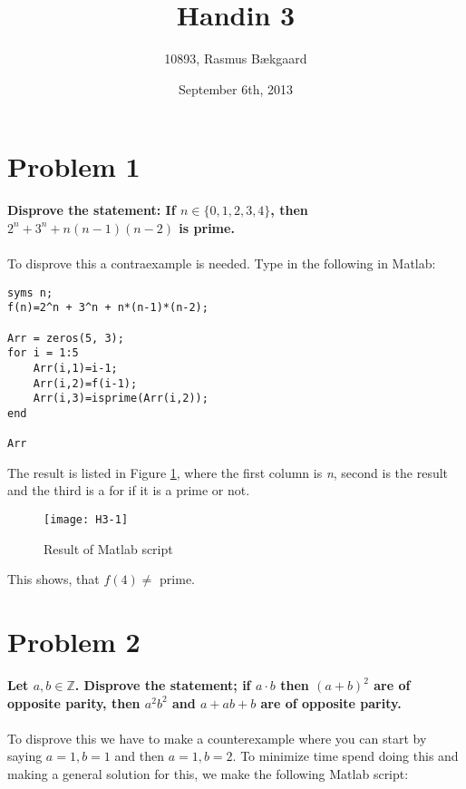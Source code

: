 \documentclass[english,10pt,a4paper]{article}
\title{Handin 3}
\author{10893, Rasmus Bækgaard}
\date{September 6th, 2013}
\begin{document}
\maketitle

\section*{Problem 1}
\textbf{Disprove the statement: If $n \in \{0, 1, 2, 3, 4\}$, then $2^n + 3^n + n(n-1)(n-2)$ is prime.}
\\
\\
To disprove this a contraexample is needed. 
Type in the following in Matlab:

\begin{lstlisting}[caption=Problem 1, style=Code-Matlab, label=lst:ref]
syms n;
f(n)=2^n + 3^n + n*(n-1)*(n-2);

Arr = zeros(5, 3);
for i = 1:5
    Arr(i,1)=i-1;
    Arr(i,2)=f(i-1);
    Arr(i,3)=isprime(Arr(i,2));
end

Arr
\end{lstlisting}
The result is listed in Figure \ref{fig:prob1}, where the first column is \textit{n}, second is the result and the third is a  for if it is a prime or not.
\begin{figure}[hbtp]
\centering
\texttt{[image: H3-1]}
\caption{Result of Matlab script}
\label{fig:prob1}
\end{figure}
This shows, that $f(4) \not=$ prime.


\section*{Problem 2}
\textbf{Let $a,b \in \mathbb{Z}$. Disprove the statement; if $a\cdot b$ then $(a+b)^2$ are of opposite parity, then $a^2b^2$ and $a+ab+b$ are of opposite parity.}
\\
\\
To disprove this we have to make a counterexample where you can start by saying $a=1, b=1$ and then $a=1, b=2$.
To minimize time spend doing this and making a general solution for this, we make the following Matlab script:
\end{document}
